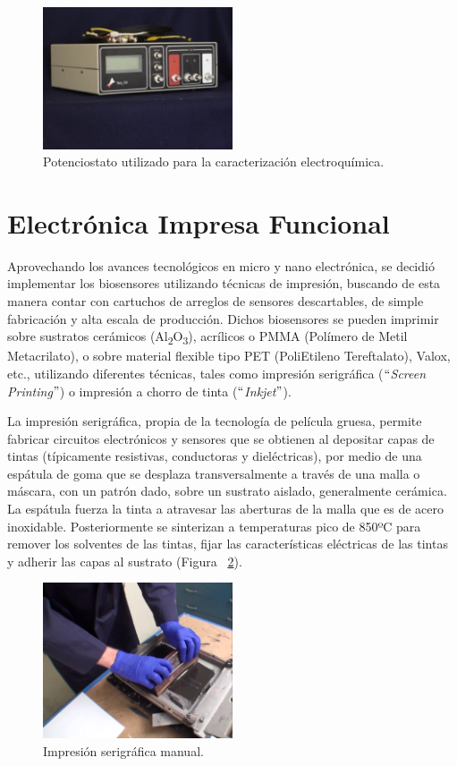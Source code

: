 \begin{figure}[H]
  \centering
    \includegraphics[width=0.5\textwidth]{Figuras/Figura_potenciostato}
  \caption{Potenciostato utilizado para la caracterización electroquímica.}
  \label{fig:Figura_potenciostato}
\end{figure}

\section{Electr\'onica Impresa Funcional}
Aprovechando los avances tecnológicos en micro y nano electrónica, se decidió implementar los biosensores utilizando técnicas de impresión, buscando de esta manera contar con cartuchos de arreglos de sensores descartables, de simple fabricación y alta escala de producción. Dichos biosensores se pueden imprimir sobre sustratos cerámicos (Al\textsubscript{2}O\textsubscript{3}), acrílicos o PMMA (Polímero de Metil Metacrilato), o sobre material flexible tipo PET (PoliEtileno Tereftalato), Valox, etc., utilizando diferentes técnicas, tales como impresión serigráfica ($``$\textit{Screen Printing}$"$) o impresión a chorro de tinta ($``$\textit{Inkjet}$"$).

La impresión serigráfica, propia de la tecnología de película gruesa, permite fabricar circuitos electrónicos y sensores que se obtienen al depositar capas de tintas (típicamente resistivas, conductoras y dieléctricas), por medio de una espátula de goma que se desplaza transversalmente a través de una malla o máscara, con un patrón dado, sobre un sustrato aislado, generalmente cerámica. La espátula fuerza la tinta a atravesar las aberturas de la malla que es de acero inoxidable. Posteriormente se sinterizan a temperaturas pico de 850ºC para remover los solventes de las tintas, fijar las características eléctricas de las tintas y adherir las capas al sustrato (Figura ~\ref{fig:Figura_serigrafia}).

\begin{figure}[H]
  \centering
    \includegraphics[width=0.5\textwidth]{Figuras/Figura_serigrafia}
  \caption{Impresión serigráfica manual.}
  \label{fig:Figura_serigrafia}
\end{figure}


